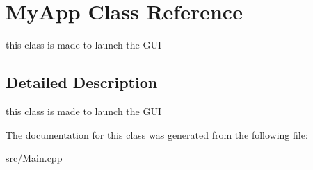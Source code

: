 \hypertarget{classMyApp}{
\section{MyApp Class Reference}
\label{classMyApp}
}


this class is made to launch the GUI  




\subsection{Detailed Description}
this class is made to launch the GUI 

The documentation for this class was generated from the following file:\begin{DoxyCompactItemize}
\item 
src/Main.cpp\end{DoxyCompactItemize}
